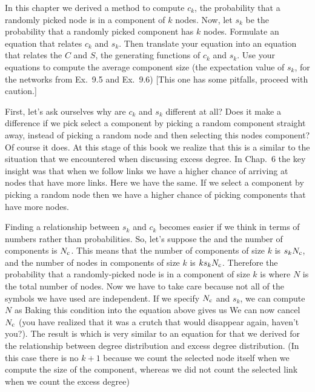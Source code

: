 In this chapter we derived a method to compute $c_k$, the probability 
that a randomly picked node is in a component of $k$ nodes. Now, let $s_k$ be the probability that a randomly picked component has $k$ nodes. Formulate an equation that relates $c_k$ and $s_k$. Then translate your equation into an equation that relates the $C$ and $S$, the generating functions of $c_k$ and $s_k$. Use your equations to compute the average component size (the expectation value of $s_k$, for the networks from Ex.~9.5 and Ex.~9.6) [This one has some pitfalls, proceed with caution.]

\solution 
First, let's ask ourselves why are $c_k$ and $s_k$ different at all?
Does it make a difference if we pick select a component by picking a random component straight away, instead of picking a random node and then selecting this nodes component? Of course it does. At this stage of this 
book we realize that this is a similar to the situation that we encountered when discussing excess degree. In Chap.~6 the key insight was that when we follow links we have a higher chance of arriving at nodes that have more links. Here we have the same. If we select a component by picking a random node then we have a higher chance of picking components that have more nodes. 

Finding a relationship between $s_k$ and $c_k$ becomes easier if we think in terms of numbers rather than probabilities. So, let's suppose the and the number of components is $N_{\rm c}$. This means that the number of components of size $k$ is $s_kN_{\rm c}$, and the number of nodes in components of size $k$ is $ks_kN_{\rm c}$. Therefore the probability that a randomly-picked node is in a component of size $k$ is 
where $N$ is the total number of nodes. Now we have to take care because not all of the symbols we have used are independent. If we specify $N_{\rm c}$ and $s_k$, we can compute $N$ as 
Baking this condition into the equation above gives us
We can now cancel $N_{\rm c}$ (you have realized that it was a crutch that would disappear again, haven't you?). The result is 
which is very similar to an equation for that we derived for the relationship between degree distribution and excess degree distribution. 
(In this case there is no $k+1$ because we count the selected node itself
when we compute the size of the component, whereas we did not count the selected link when we count the excess degree)

